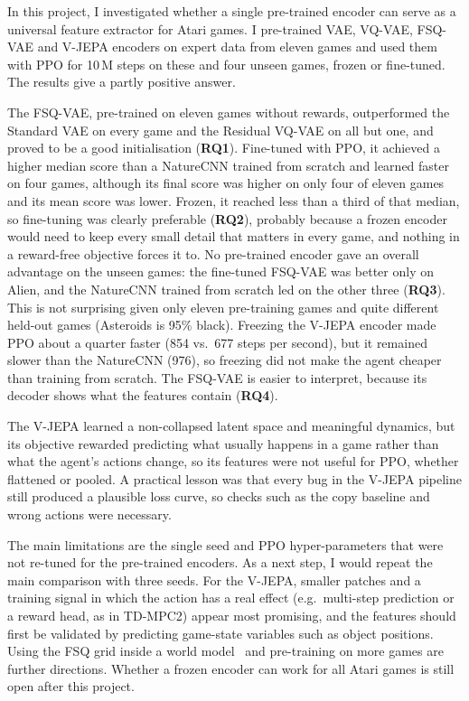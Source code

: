 \documentclass[runningheads]{llncs}
\begin{document}
In this project, I investigated whether a single pre-trained encoder can serve as a universal
feature extractor for Atari games. I pre-trained VAE, VQ-VAE, FSQ-VAE and V-JEPA encoders on
expert data from eleven games and used them with PPO for 10\,M steps on these and four unseen
games, frozen or fine-tuned. The results give a partly positive answer.

The FSQ-VAE, pre-trained on eleven games without rewards, outperformed the Standard VAE on every
game and the Residual VQ-VAE on all but one, and proved to be a good initialisation
(\textbf{RQ1}). Fine-tuned with PPO, it achieved a higher median score than a NatureCNN trained
from scratch and learned faster on four games, although its final score was higher on only
four of eleven games and its mean score was lower. Frozen, it reached less than a third of that
median, so fine-tuning was clearly preferable (\textbf{RQ2}), probably because a frozen encoder
would need to keep every small detail that matters in every game, and nothing in a reward-free
objective forces it to. No pre-trained encoder gave an overall advantage on the unseen games: the
fine-tuned FSQ-VAE was better only on Alien, and the NatureCNN trained from scratch led on the
other three (\textbf{RQ3}). This is not surprising given only eleven pre-training games and
quite different held-out games (Asteroids is 95\% black). Freezing the V-JEPA encoder made PPO about a quarter
faster (854 vs.\ 677 steps per second), but it remained slower than the NatureCNN (976), so
freezing did not make the agent cheaper than training from scratch. The FSQ-VAE is easier to
interpret, because its decoder shows what the features contain (\textbf{RQ4}).

The V-JEPA learned a non-collapsed latent space and meaningful dynamics, but its objective
rewarded predicting what usually happens in a game rather than what the agent's actions change,
so its features were not useful for PPO, whether flattened or pooled. A practical lesson was that every bug in the V-JEPA pipeline still produced a plausible loss
curve, so checks such as the copy baseline and wrong actions were necessary.

The main limitations are the single seed and PPO hyper-parameters that were not re-tuned for
the pre-trained encoders. As a next step, I would repeat the main comparison with three seeds.
For the V-JEPA, smaller patches and a training signal in which the
action has a real effect (e.g.\ multi-step prediction or a reward head, as in TD-MPC2) appear
most promising, and the features should first be validated by predicting game-state variables
such as object positions. Using the FSQ grid inside a world
model~\cite{hafner2021dreamerv2,micheli2023iris} and pre-training on more games are further
directions. Whether a frozen encoder can work for all Atari games is still open after this
project.
\end{document}
